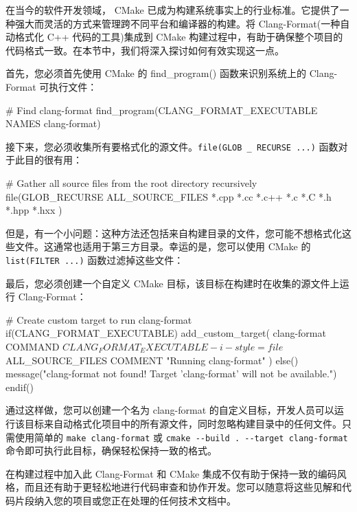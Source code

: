 在当今的软件开发领域， CMake 已成为构建系统事实上的行业标准。它提供了一种强大而灵活的方式来管理跨不同平台和编译器的构建。将 Clang-Format(一种自动格式化 C++ 代码的工具)集成到 CMake 构建过程中，有助于确保整个项目的代码格式一致。在本节中，我们将深入探讨如何有效实现这一点。

首先，您必须首先使用 CMake 的 find\_program() 函数来识别系统上的 Clang-Format 可执行文件：

\begin{cmake}
# Find clang-format
find_program(CLANG_FORMAT_EXECUTABLE NAMES clang-format)
\end{cmake}

接下来，您必须收集所有要格式化的源文件。\verb|file(GLOB _ RECURSE ...)| 函数对于此目的很有用：

\begin{cmake}
# Gather all source files from the root directory recursively
file(GLOB_RECURSE ALL_SOURCE_FILES
    *.cpp
    *.cc
    *.c++
    *.c
    *.C
    *.h
    *.hpp
    *.hxx
)
\end{cmake}

但是，有一个小问题：这种方法还包括来自构建目录的文件，您可能不想格式化这些文件。这通常也适用于第三方目录。幸运的是，您可以使用 CMake 的 \verb|list(FILTER ...)| 函数过滤掉这些文件：


最后，您必须创建一个自定义 CMake 目标，该目标在构建时在收集的源文件上运行 Clang-Format：

\begin{cmake}
# Create custom target to run clang-format
if(CLANG_FORMAT_EXECUTABLE)
    add_custom_target(
        clang-format
        COMMAND ${CLANG_FORMAT_EXECUTABLE} -i -style=file ${ALL_SOURCE_FILES}
        COMMENT "Running clang-format"
    )
else()
    message("clang-format not found! Target 'clang-format' will not be available.")
endif()
\end{cmake}

通过这样做，您可以创建一个名为 clang-format 的自定义目标，开发人员可以运行该目标来自动格式化项目中的所有源文件，同时忽略构建目录中的任何文件。只需使用简单的 \verb|make clang-format| 或 \verb|cmake --build . --target clang-format| 命令即可执行此目标，确保轻松保持一致的格式。

在构建过程中加入此 Clang-Format 和 CMake 集成不仅有助于保持一致的编码风格，而且还有助于更轻松地进行代码审查和协作开发。您可以随意将这些见解和代码片段纳入您的项目或您正在处理的任何技术文档中。



